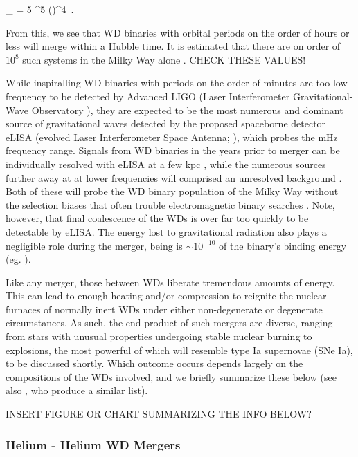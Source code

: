 \eqbegin
\tau_{} = 5 ^5 \left(\right)^4 \frac{\Msun}{\Ma} \frac{\Msun}{\Md} \frac{\Msun}{\Mtot}\,.
\label{eq:c1_gravtimescale}
\eqend

\noindent From this, we see that WD binaries with orbital periods on the order of hours or less will merge within a Hubble time.  It is estimated that there are on order of $10^8$ such systems in the Milky Way alone \citep{nele+01a,mars11}.  {\charles CHECK THESE VALUES!}

While inspiralling WD binaries with periods on the order of minutes are too low-frequency to be detected by Advanced LIGO (Laser Interferometer Gravitational-Wave Observatory \citealt{ligo+15}), they are expected to be the most numerous and dominant source of gravitational waves \citep{mars11} detected by the proposed spaceborne detector eLISA (evolved Laser Interferometer Space Antenna; \citealt{amar+13}), which probes the mHz frequency range.  Signals from WD binaries in the years prior to merger can be individually resolved with eLISA at a few kpc \citep{loreig09, dan+11}, while the numerous sources further away at at lower frequencies will comprised an unresolved background \cite{neleyp01,amar+13}.  Both of these will probe the WD binary population of the Milky Way without the selection biases that often trouble electromagnetic binary searches \citep{mars11}.  {\charles Note, however, that final coalescence of the WDs is over far too quickly to be detectable by eLISA.}  The energy lost to gravitational radiation also plays a negligible role during the merger, being is $\sim10^{-10}$ of the binary's binding energy (eg. \citealt{loreig09}).

Like any merger, those between WDs liberate tremendous amounts of energy.  This can lead to enough heating and/or compression to reignite the nuclear furnaces of normally inert WDs under either non-degenerate or degenerate circumstances.  As such, the end product of such mergers are diverse, ranging from stars with unusual properties undergoing stable nuclear burning to explosions, the most powerful of which will resemble type Ia supernovae (SNe Ia), to be discussed shortly.  Which outcome occurs depends largely on the compositions of the WDs involved, and we briefly summarize these below (see also \citealt{dan+14}, who produce a similar list).

{\charles INSERT FIGURE OR CHART SUMMARIZING THE INFO BELOW?}

\subsubsection{Helium - Helium WD Mergers}


